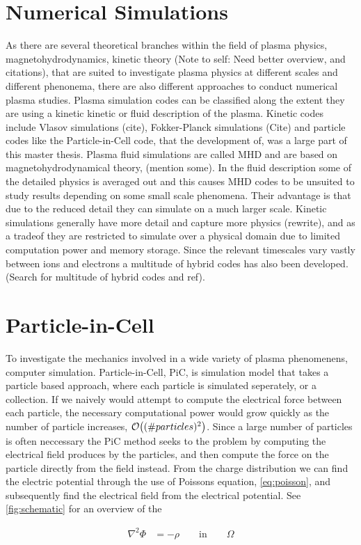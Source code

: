 \section{Numerical Simulations}
	As there are several theoretical branches within the field of plasma physics,
	magnetohydrodynamics, kinetic theory (Note to self:  Need better overview, and citations),
	that are suited to investigate plasma physics at different scales and different phenonema,
	there are also different approaches to conduct numerical plasma studies.
	Plasma simulation codes can be classified along the extent they are using a
	kinetic kinetic or fluid description of the plasma. Kinetic codes include
	Vlasov simulations (cite), Fokker-Planck simulations (Cite) and particle codes like the
	Particle-in-Cell code, that the development of, was a large part of this master thesis.
	Plasma fluid simulations are called MHD and are based on magnetohydrodynamical theory, (mention some).
	In the fluid description some of the detailed physics is averaged out and this causes
	MHD codes to be unsuited to study results depending on some small scale phenomena.
	Their advantage is that due to the reduced detail they can simulate on a much larger scale.
	Kinetic simulations generally have more detail and capture more physics (rewrite),
	and as a tradeof they are restricted to simulate over a physical domain due to
	limited computation power and memory storage.
	Since the relevant timescales vary vastly between ions and electrons a multitude
	of hybrid codes has also been developed. (Search for multitude of hybrid codes and ref).



	\section{Particle-in-Cell}
	 To investigate the mechanics involved in a wide variety of plasma phenomenens,
	 computer simulation. Particle-in-Cell, PiC, is simulation model that takes a
	 particle based approach, where each particle is simulated seperately, or a
	 collection. If we naively would attempt to compute the electrical force between each particle, the necessary
	 computational power would grow quickly as the number of particle increases, \(\order{(\#particles)^2}\).
	 Since a large number of particles is often neccessary the PiC method seeks to
	 the problem by computing the electrical field produces by the particles, and then
	 compute the force on the particle directly from the field instead. From the charge
	 distribution we can find the electric potential through the use of Poissons
	 equation, \cref{eq:poisson}, and subsequently find the electrical field from
	 the electrical potential. See \cref{fig:schematic} for an overview of the

		\begin{align}
			\nabla ^2 \Phi &= -\rho \qquad \text{in} \qquad \Omega \label{eq:poisson}
		\end{align}

	  


